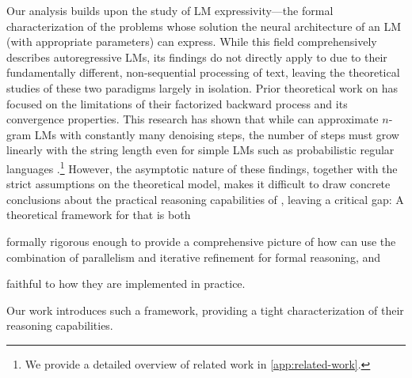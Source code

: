 \documentclass{article} %
\begin{document}
Our analysis builds upon the study of LM expressivity---the formal characterization of the problems whose solution the neural architecture of an LM (with appropriate parameters) can express. 
While this field comprehensively describes autoregressive LMs, its findings do not directly apply to \MDMsAcr due to their fundamentally different, non-sequential processing of text, leaving the theoretical studies of these two paradigms largely in isolation. 
Prior theoretical work on \MDMsAcr has focused on the limitations of their factorized backward process and its convergence properties.
This research has shown that while \MDMsAcr can approximate $n$-gram LMs with constantly many denoising steps, the number of steps must grow linearly with the string length even for simple LMs such as probabilistic regular languages \citep{feng2025theoreticalbenefitlimitationdiffusion,li2025convergencetheorydiffusionlanguage}.\footnote{We provide a detailed overview of related work in \cref{app:related-work}.} 
However, the asymptotic nature of these findings, together with the strict assumptions on the theoretical model, makes it difficult to draw concrete conclusions about the practical reasoning capabilities of \MDMsAcr, leaving a critical gap: A theoretical framework for \MDMsAcr that is both 
\begin{enumerate*}[label={(\arabic*)}]
    \item formally rigorous enough to provide a comprehensive picture of how \MDMsAcr can use the combination of parallelism and iterative refinement for formal reasoning, and
    \item faithful to how they are implemented in practice.
\end{enumerate*}
Our work introduces such a framework, providing a tight characterization of their reasoning capabilities.
\end{document}
